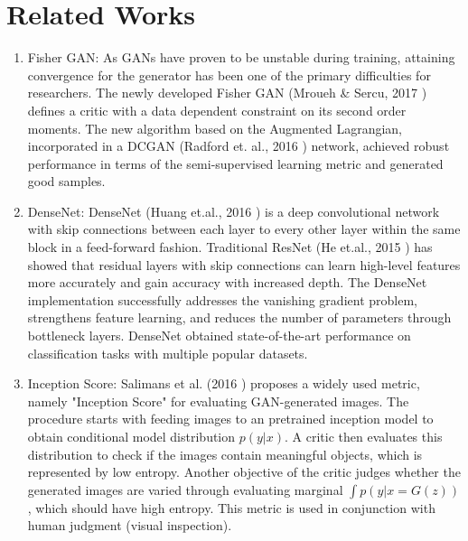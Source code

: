 \documentclass{article}
\begin{document}
\section{Related Works}
\label{sec:RW}

\begin{enumerate}
    \item 
    Fisher GAN: 
    As GANs have proven to be unstable during training, attaining convergence for the generator has been one of the primary difficulties for researchers. The newly developed Fisher GAN (Mroueh \& Sercu, 2017 \cite{DBLP:journals/corr/MrouehS17}) defines a critic with a data dependent constraint on its second order moments. The new algorithm based on the Augmented Lagrangian, incorporated in a DCGAN (Radford et. al., 2016 \cite{DBLP:journals/corr/RadfordMC15}) network, achieved robust performance in terms of the semi-supervised learning metric and generated good samples. 
    

    \item 
    DenseNet:
    DenseNet (Huang et.al., 2016 \cite{DBLP:journals/corr/HuangLW16}) is a deep convolutional network with skip connections between each layer to every other layer within the same block in a feed-forward fashion. Traditional ResNet (He et.al., 2015 \cite{DBLP:journals/corr/HeZRS15}) has showed that residual layers with skip connections can learn high-level features more accurately and gain accuracy with increased depth. The DenseNet implementation successfully addresses the vanishing gradient problem, strengthens feature learning, and reduces the number of parameters through bottleneck layers. DenseNet obtained state-of-the-art performance on classification tasks with multiple popular datasets. 
    
    \item 
    Inception Score:
    Salimans et al. (2016 \cite{DBLP:journals/corr/SalimansGZCRC16}) proposes a widely used metric, namely "Inception Score" for evaluating GAN-generated images. The procedure starts with feeding images to an pretrained inception model to obtain conditional model distribution $p(y|x)$. A critic then evaluates this distribution to check if the images contain meaningful objects, which is represented by low entropy. Another objective of the critic judges whether the generated images are varied through evaluating marginal $\int p(y|x = G(z))$, which should have high entropy. This metric is used in conjunction with human judgment (visual inspection). 
    
\end{enumerate}
\end{document}
